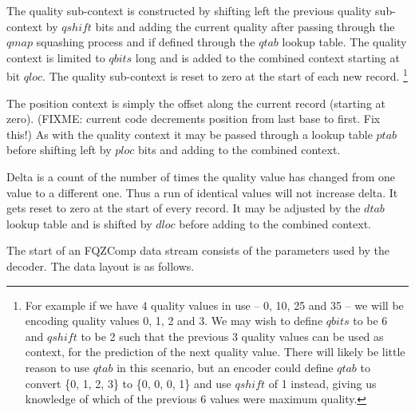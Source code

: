 \documentclass[a4paper]{article}
\begin{document}
The quality sub-context is constructed by shifting left the previous
quality sub-context by $qshift$ bits and adding the current quality
after passing through the $qmap$ squashing process and if defined
through the $qtab$ lookup table.  The quality context is limited to
$qbits$ long and is added to the combined context starting at bit
$qloc$.  The quality sub-context is reset to zero at the start of each
new record.
\footnote{For example if we have 4 quality values in use -- 0, 10, 25 and
35 -- we will be encoding quality values 0, 1, 2 and 3.  We may wish to
define $qbits$ to be 6 and $qshift$ to be 2 such that the previous 3
quality values can be used as context, for the prediction of the next
quality value.  There will likely be little reason to use $qtab$ in
this scenario, but an encoder could define $qtab$ to convert \{0, 1, 2, 3\}
to \{0, 0, 0, 1\} and use $qshift$ of 1 instead, giving us
knowledge of which of the previous 6 values were maximum quality.}

The position context is simply the offset along the current record
(starting at zero).  (FIXME: current code decrements position from
last base to first.  Fix this!)  As with the quality context it may be
passed through a lookup table $ptab$ before shifting left by $ploc$
bits and adding to the combined context.

Delta is a count of the number of times the quality value has changed
from one value to a different one.  Thus a run of identical values
will not increase delta.  It gets reset to zero at the start of every
record.  It may be adjusted by the $dtab$ lookup table and is shifted
by $dloc$ before adding to the combined context.

The start of an FQZComp data stream consists of the parameters used by
the decoder. The data layout is as follows.
\end{document}
